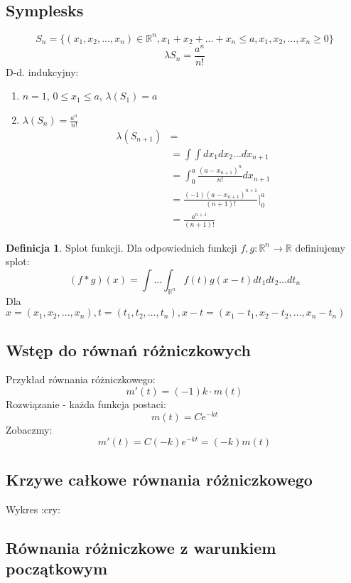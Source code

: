 \documentclass{article}
\theoremstyle{definition}
\newtheorem{de}{Definicja}[subsection]
\theoremstyle{definition}
\theoremstyle{definition}
\theoremstyle{definition}
\begin{document}
\subsection{Symplesks}

\[S_n=\{(x_1,x_2,\dots,x_n)\in\mathbb{R}^n, x_1+x_2+\dots+x_n\leq a, x_1,x_2,\dots,x_n\geq 0\}\]
\[\lambda{S_n}=\frac{a^n}{n!}\]
D-d. indukcyjny:
\begin{enumerate}
    \item $n=1$, $0\leq x_1\leq a$, $\lambda(S_1)=a$ 
    \item $\lambda(S_n)=\frac{a^n}{n!}$
    \begin{align}
        \lambda(S_{n+1})&=\\
        &= \int\int dx_1 dx_2\dots dx_{n+1}\\
        &= \int_{0}^{a} \frac{(a-x_{n+1})^n}{n!} dx_{n+1}\\
        &= \frac{(-1)(a-x_{n+1})^{n+1}}{(n+1)!}|_{0}^{a}\\
        &= \frac{a^{n+1}}{(n+1)!}
    \end{align}
\end{enumerate}

\begin{de}
    Splot funkcji. Dla odpowiednich funkcji $f,g:\mathbb{R}^n\rightarrow \mathbb{R}$
    definiujemy splot:
    \[(f*g)(x) = \int\dots\int_{\mathbb{R}^n} f(t)g(x-t) dt_1 dt_2 \dots dt_n\]
    Dla $x=(x_1,x_2,\dots,x_n), t=(t_1,t_2,\dots,t_n), x-t=(x_1-t_1,x_2-t_2,\dots,x_n-t_n)$
\end{de}

\subsection{Wstęp do równań różniczkowych}

Przykład równania różniczkowego:
\[m'(t)=(-1)k \cdot m(t)\]
Rozwiązanie - każda funkcja postaci:
\[m(t)=Ce^{-kt}\]
Zobaczmy:
\[m'(t)=C (-k) e^{-kt} = (-k) m(t)\]

\subsection{Krzywe całkowe równania różniczkowego}

Wykres :cry:

\subsection{Równania różniczkowe z warunkiem początkowym}
\end{document}

